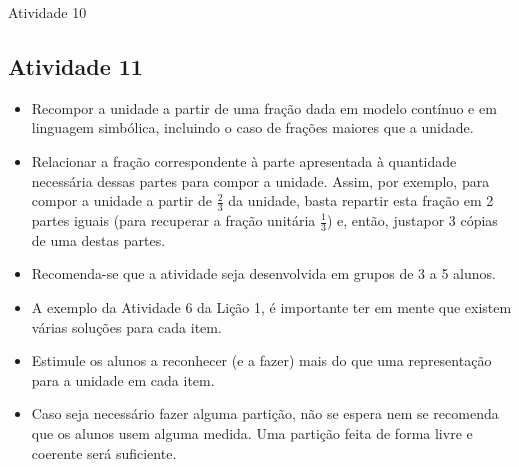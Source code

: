 \begin{multicols}{2}
\begin{resposta*}{Atividade 10}
\end{resposta*}

\newpage

\subsection{Atividade 11}

   \vspace{.1cm}

  \begin{itemize} %
    \item       Recompor a unidade a partir de uma fração dada em modelo contínuo e em linguagem simbólica, incluindo o caso de frações maiores que a unidade.
    \item       Relacionar a fração correspondente à parte apresentada à quantidade necessária dessas partes para compor a unidade. Assim, por exemplo, para compor a unidade a partir de       $\frac{2}{3}$ da unidade, basta repartir esta fração em 2 partes iguais (para recuperar a fração unitária       $\frac{1}{3}$) e, então, justapor 3 cópias de uma destas partes.
\end{itemize} %

  \vspace{.1cm} \vspace{.1cm}

  \begin{itemize} %
    \item       Recomenda-se que a atividade seja desenvolvida em grupos de 3 a 5 alunos.
    \item       A exemplo da Atividade 6 da Lição 1, é importante ter em mente que existem várias soluções para cada item.
    \item       Estimule os alunos a reconhecer (e a fazer) mais do que uma representação para a unidade em cada item.
    \item       Caso seja necessário fazer alguma partição, não se espera nem se recomenda que os alunos usem alguma medida. Uma partição feita de forma livre e coerente será suficiente.
\end{itemize} %

  \vspace{.1cm}



\end{multicols}
